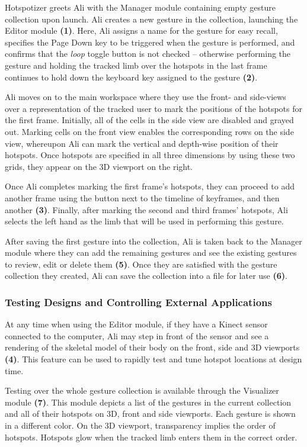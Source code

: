 Hotspotizer greets Ali with the Manager module containing empty gesture collection upon launch. Ali creates a new gesture in the collection, launching the Editor module \textbf{(1)}. Here, Ali assigns a name for the gesture for easy recall, specifies the Page Down key to be triggered when the gesture is performed, and confirms that the \emph{loop} toggle button is not checked – otherwise performing the gesture and holding the tracked limb over the hotspots in the last frame continues to hold down the keyboard key assigned to the gesture \textbf{(2)}.

Ali moves on to the main workspace where they use the front- and side-views over a representation of the tracked user to mark the positions of the hotspots for the first frame. Initially, all of the cells in the side view are disabled and grayed out. Marking cells on the front view enables the corresponding rows on the side view, whereupon Ali can mark the vertical and depth-wise position of their hotspots. Once hotspots are specified in all three dimensions by using these two grids, they appear on the 3D viewport on the right.

Once Ali completes marking the first frame’s hotspots, they can proceed to add another frame using the button next to the timeline of keyframes, and then another \textbf{(3)}. Finally, after marking the second and third frames’ hotspots, Ali selects the left hand as the limb that will be used in performing this gesture.

After saving the first gesture into the collection, Ali is taken back to the Manager module where they can add the remaining gestures and see the existing gestures to review, edit or delete them \textbf{(5)}. Once they are satisfied with the gesture collection they created, Ali can save the collection into a file for later use \textbf{(6)}.

\subsubsection{Testing Designs and Controlling External Applications}

At any time when using the Editor module, if they have a Kinect sensor connected to the computer, Ali may step in front of the sensor and see a rendering of the skeletal model of their body on the front, side and 3D viewports \textbf{(4)}. This feature can be used to rapidly test and tune hotspot locations at design time.

Testing over the whole gesture collection is available through the Visualizer module \textbf{(7)}. This module depicts a list of the gestures in the current collection and all of their hotspots on 3D, front and side viewports. Each gesture is shown in a different color. On the 3D viewport, transparency implies the order of hotspots. Hotspots glow when the tracked limb enters them in the correct order.


